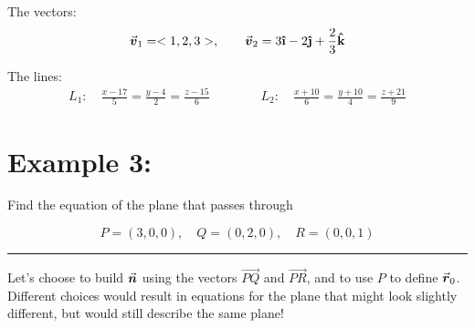 \begin{list}{\bf{Warmup : }}{}

\item The vectors:
\[ 
\v_1 = < 1, 2, 3>, \qquad \v_2 = 3\ihat - 2\jhat + \frac{2}{3}\khat
\]

\vfill

\item The lines:
\begin{eqnarray*}
L_1: \quad  \frac{x-17}{5} = \frac{y-4}{2} = \frac{z-15}{6}  \qquad \qquad%
L_2: \quad  \frac{x+10}{6} = \frac{y+10}{4} = \frac{z+21}{9}
\end{eqnarray*}


\vfill


%

%
%




\end{list}



\pagebreak

\section*{Example 3:}%

Find the equation of the plane that passes through 

\[P = (3,0,0), \quad Q = (0, 2, 0), \quad R = (0,0,1)\]

\hrule
\vspace*{.1in}

Let's choose to build \(\n\) using the vectors \(\overrightarrow{PQ}\) and \(\overrightarrow{PR}\), and to use \(P\) to define \(\r_0\). Different choices would result in equations for the plane that might look slightly different, but would still describe the same plane!



